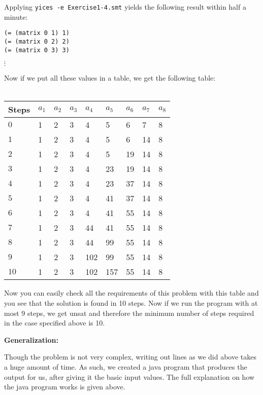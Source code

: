 \documentclass[12pt]{article}
\begin{document}
\noindent Applying {\tt yices -e Exercise1-4.smt} yields the following result
within half a minute:

{\footnotesize
\begin{verbatim}
(= (matrix 0 1) 1)
(= (matrix 0 2) 2)
(= (matrix 0 3) 3)
\end{verbatim}
$\vdots$
}

\noindent Now if we put all these values in a table, we get the following table:\\
\\
\begin{tabular}{| l | l | l | l | l | l | l | l | l |}
\hline
Steps	& $a_1$	& $a_2$	& $a_3$ & $a_4$ & $a_5$	& $a_6$	& $a_7$ & $a_8$\\
\hline
$0$	& 1	&	2	&	3 & 4	&	5	&	6 & 7 & 8\\
$1$	& 1	&	2	&	3 & 4	&	5	&	6 & 14 & 8\\
$2$	& 1	&	2	&	3 & 4	&	5	&	19 & 14 & 8\\
$3$	& 1	&	2	&	3 & 4	&	23	&	19& 14 & 8\\
$4$	& 1	&	2	&	3 & 4	&	23	&	37 & 14 & 8\\
$5$	& 1	&	2	&	3 & 4	&	41	&	37 & 14 & 8\\
$6$	& 1	&	2	&	3 & 4	&	41	&	55 & 14 & 8\\
$7$	& 1	&	2	&	3 & 44	&	41	&	55 & 14 & 8\\
$8$	& 1	&	2	&	3 & 44	&	99	&	55 & 14 & 8\\
$9$	& 1	&	2	&	3 & 102	&	99	&	55 & 14 & 8\\
$10$	& 1	&	2	&	3 & 102	&	157	&	55 & 14 & 8\\
\hline
\end{tabular}

\vspace{3mm}

Now you can easily check all the requirements of this problem with this table and you see that the solution is found in 10 steps. Now if we run the program with at most 9 steps, we get unsat and therefore the minimum number of steps required in the case specified above is 10.

\vspace{3mm}

{\bf Generalization:}

Though the problem is not very complex, writing out lines as we did above takes a huge amount of time. As such, we created a java program that produces the output for us, after giving it the basic input values. The full explanation on how the java program works is given above.\\

\vspace{3mm}
\end{document}
